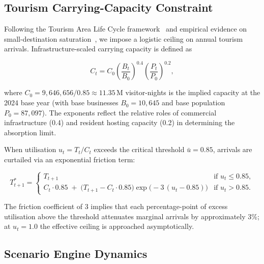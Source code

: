 \documentclass[urbansci,article,submit,pdftex,moreauthors]{Definitions/mdpi}
\begin{document}
\subsection{Tourism Carrying-Capacity Constraint}
\label{sec:tourism_cap}

Following the Tourism Area Life Cycle framework~\cite{Butler1980} and empirical
evidence on small-destination saturation~\cite{Peeters2019}, we impose a
logistic ceiling on annual tourism arrivals. Infrastructure-scaled carrying
capacity is defined as

\begin{linenomath}
\begin{equation}
  C_t = C_0 \left(\frac{B_t}{B_0}\right)^{0.4}
              \left(\frac{P_t}{P_0}\right)^{0.2},
  \label{eq:tour_cap}
\end{equation}
\end{linenomath}

where $C_0 = 9{,}646{,}656 / 0.85 \approx 11.35\,\text{M}$ visitor-nights is
the implied capacity at the 2024 base year (with base businesses $B_0=10{,}645$
and base population $P_0=87{,}097$). The exponents reflect the relative roles of
commercial infrastructure (0.4) and resident hosting capacity (0.2) in
determining the absorption limit.

When utilisation $u_t = T_t / C_t$ exceeds the critical threshold
$\bar{u}=0.85$, arrivals are curtailed via an exponential friction term:

\begin{linenomath}
\begin{equation}
  T_{t+1}^* =
  \begin{cases}
    T_{t+1} & \text{if } u_t \leq 0.85,\\[4pt]
    C_t \cdot 0.85\;+\;\bigl(T_{t+1} - C_t \cdot 0.85\bigr)
        \exp\!\bigl(-3\,(u_t - 0.85)\bigr) & \text{if } u_t > 0.85.
  \end{cases}
  \label{eq:tour_friction}
\end{equation}
\end{linenomath}

The friction coefficient of 3 implies that each percentage-point of excess
utilisation above the threshold attenuates marginal arrivals by approximately
3\%; at $u_t=1.0$ the effective ceiling is approached asymptotically.

\subsection{Scenario Engine Dynamics}
\label{subsec:scenario_engine}
\end{document}
